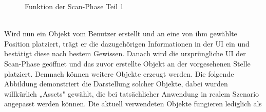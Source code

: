 \begin{figure}[hbt!]
    \centering
    \caption{Funktion der Scan-Phase Teil 1}
    \label{pic:markerTracking}
\end{figure}
\pagebreak 
\\ 
\linebreak
Wird nun ein Objekt vom Benutzer erstellt und an eine von ihm gewählte Position platziert, trägt er die dazugehörigen Informationen in der \acs{UI} 
ein und bestätigt diese nach bestem Gewissen. Danach wird die ursprüngliche \acs{UI} der Scan-Phase geöffnet und das zuvor erstellte Objekt an der vorgesehenen 
Stelle platziert. Demnach können weitere Objekte erzeugt werden. Die folgende Abbildung demonstriert die Darstellung solcher Objekte, dabei wurden willkürlich 
„Assets" gewählt, die bei tatsächlicher Anwendung in realem Szenario angepasst werden können. Die aktuell verwendeten Objekte fungieren lediglich als 
